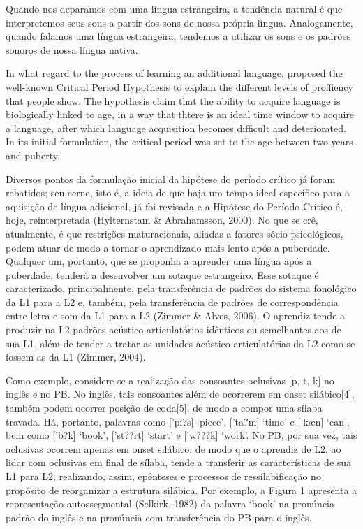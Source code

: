 Quando nos deparamos com uma l\'ingua estrangeira, a tend\^encia natural \'e
que interpretemos seus sons a partir dos sons de nossa pr\'opria l\'ingua.
Analogamente, quando falamos uma l\'ingua estrangeira, tendemos a utilizar
os sons e os padr\~oes sonoros de nossa l\'ingua nativa.

In what regard to the process of learning an additional language, \cite{Lenneberg1967}
proposed the well-known Critical Period Hypothesis to explain the different levels
of proffiency that people show. The hypothesis claim that the ability to acquire 
language is biologically linked to age, in a way that thtere is an ideal time window
to acquire a language, after which language acquisition becomes difficult and deteriorated.
In its initial formulation, the critical period was set to the age between two years and puberty.

Diversos pontos da formula\c{c}\~ao inicial da hip\'otese do per\'iodo cr\'itico j\'a
foram rebatidos; seu cerne, isto \'e, a ideia de que haja um tempo ideal
espec\'ifico para a aquisi\c{c}\~ao de l\'ingua adicional, j\'a foi revisada e a
Hip\'otese do Per\'iodo Cr\'itico \'e, hoje, reinterpretada (Hylternstam \&
Abrahamsson, 2000). No que se cr\^e, atualmente, \'e que restri\c{c}\~oes
maturacionais, aliadas a fatores s\'ocio-psicol\'ogicos, podem atuar de modo
a tornar o aprendizado mais lento ap\'os a puberdade. Qualquer um,
portanto, que se proponha a aprender uma l\'ingua ap\'os a puberdade,
tender\'a a desenvolver um sotaque estrangeiro. Esse sotaque \'e
caracterizado, principalmente, pela transfer\^encia de padr\~oes do sistema
fonol\'ogico da L1 para a L2 e, tamb\'em, pela transfer\^encia de padr\~oes de
correspond\^encia entre letra e som da L1 para a L2 (Zimmer \& Alves,
2006). O aprendiz tende a produzir na L2 padr\~oes ac\'ustico-articulat\'orios
id\^enticos ou semelhantes aos de sua L1, al\'em de tender a tratar as
unidades ac\'ustico-articulat\'orias da L2 como se fossem as da L1 (Zimmer,
2004).

Como exemplo, considere-se a realiza\c{c}\~ao das consoantes  oclusivas  [p,
t, k{]} no ingl\^es e no PB. No ingl\^es, tais consoantes al\'em de ocorrerem
em onset sil\'abico{[}4{]}, tamb\'em podem ocorrer posi\c{c}\~ao de coda{[}5{]},
de modo a compor uma s\'ilaba travada. H\'a, portanto, palavras como
{[}'pi?s{]} `piece', {[}'ta?m{]} `time' e {[}'kæn{]} `can', bem como
{[}'b?k{]} `book', {[}'st??rt{]} `start' e {[}'w???k{]} `work'. No PB,
por sua vez, tais oclusivas ocorrem apenas em onset sil\'abico, de modo
que o aprendiz de L2, ao lidar com oclusivas em final de s\'ilaba, tende a
transferir as caracter\'isticas de sua L1 para L2, realizando, assim,
ep\^enteses e processos de ressilabifica\c{c}\~ao no prop\'osito de reorganizar a
estrutura sil\'abica. Por exemplo, a Figura 1 apresenta a representa\c{c}\~ao
autossegmental (Selkirk, 1982) da palavra `book' na pron\'uncia padr\~ao do
ingl\^es e na pron\'uncia com transfer\^encia do PB para o ingl\^es.

